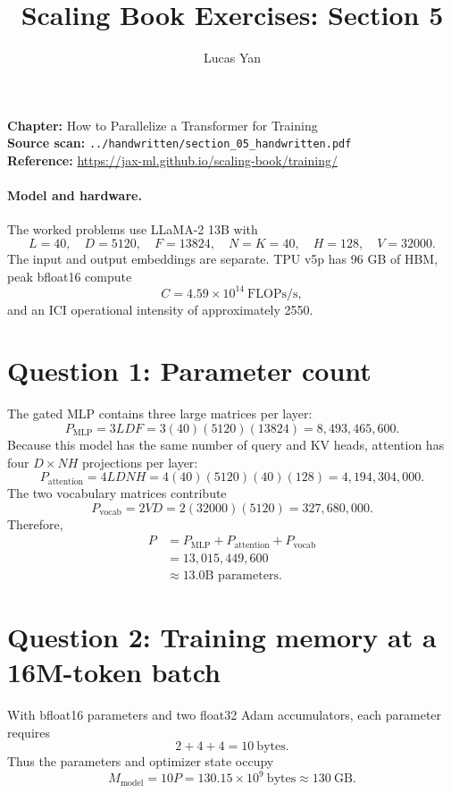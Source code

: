 \documentclass[11pt]{article}
\title{Scaling Book Exercises: Section 5}
\author{Lucas Yan}
\date{}
\begin{document}
\maketitle

\noindent
\textbf{Chapter:} How to Parallelize a Transformer for Training\\
\textbf{Source scan:} \texttt{../handwritten/section\_05\_handwritten.pdf}\\
\textbf{Reference:} \url{https://jax-ml.github.io/scaling-book/training/}

\paragraph{Model and hardware.}
The worked problems use LLaMA-2 13B with
\[
L=40,\quad D=5120,\quad F=13824,\quad N=K=40,\quad
H=128,\quad V=32000.
\]
The input and output embeddings are separate. TPU v5p has 96 GB of HBM,
peak bfloat16 compute
\[
C=4.59\times10^{14}\ \text{FLOPs/s},
\]
and an ICI operational intensity of approximately 2550.

\section*{Question 1: Parameter count}

The gated MLP contains three large matrices per layer:
\[
P_{\mathrm{MLP}}=3LDF
=3(40)(5120)(13824)
=8{,}493{,}465{,}600.
\]
Because this model has the same number of query and KV heads, attention has
four $D\times NH$ projections per layer:
\[
P_{\mathrm{attention}}=4LDNH
=4(40)(5120)(40)(128)
=4{,}194{,}304{,}000.
\]
The two vocabulary matrices contribute
\[
P_{\mathrm{vocab}}=2VD
=2(32000)(5120)
=327{,}680{,}000.
\]
Therefore,
\begin{align*}
P
&=P_{\mathrm{MLP}}+P_{\mathrm{attention}}+P_{\mathrm{vocab}}\\
&=13{,}015{,}449{,}600\\
&\approx\boxed{13.0\text{B parameters}}.
\end{align*}

\section*{Question 2: Training memory at a 16M-token batch}

With bfloat16 parameters and two float32 Adam accumulators, each parameter
requires
\[
2+4+4=10\ \text{bytes}.
\]
Thus the parameters and optimizer state occupy
\[
M_{\mathrm{model}}=10P
=130.15\times10^9\ \text{bytes}
\approx130\ \text{GB}.
\]
\end{document}
